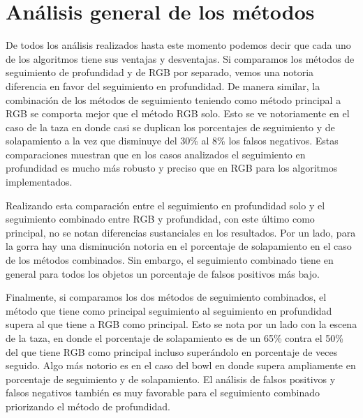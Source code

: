 \section{Análisis general de los métodos}
%
%
%
%
%

De todos los análisis realizados hasta este momento podemos decir que cada uno de los algoritmos tiene sus ventajas y desventajas. Si comparamos los métodos de seguimiento de profundidad y de RGB por separado, vemos una notoria diferencia en favor del seguimiento en profundidad. De manera similar, la combinación de los métodos de seguimiento teniendo como método principal a RGB se comporta mejor que el método RGB solo. Esto se ve notoriamente en el caso de la taza en donde casi se duplican los porcentajes de seguimiento y de solapamiento a la vez que disminuye del 30\% al 8\% los falsos negativos. Estas comparaciones muestran que en los casos analizados el seguimiento en profundidad es mucho más robusto y preciso que en RGB para los algoritmos implementados.

Realizando esta comparación entre el seguimiento en profundidad solo y el seguimiento combinado entre RGB y profundidad, con este último como principal, no se notan diferencias sustanciales en los resultados. Por un lado, para la gorra hay una disminución notoria en el porcentaje de solapamiento en el caso de los métodos combinados. Sin embargo, el seguimiento combinado tiene en general para todos los objetos un porcentaje de falsos positivos más bajo.

Finalmente, si comparamos los dos métodos de seguimiento combinados, el método que tiene como principal seguimiento al seguimiento en profundidad supera al que tiene a RGB como principal. Esto se nota por un lado con la escena de la taza, en donde el porcentaje de solapamiento es de un 65\% contra el 50\% del que tiene RGB como principal incluso superándolo en porcentaje de veces seguido. Algo más notorio es en el caso del bowl en donde supera ampliamente en porcentaje de seguimiento y de solapamiento. El análisis de falsos positivos y falsos negativos también es muy favorable para el seguimiento combinado priorizando el método de profundidad.

